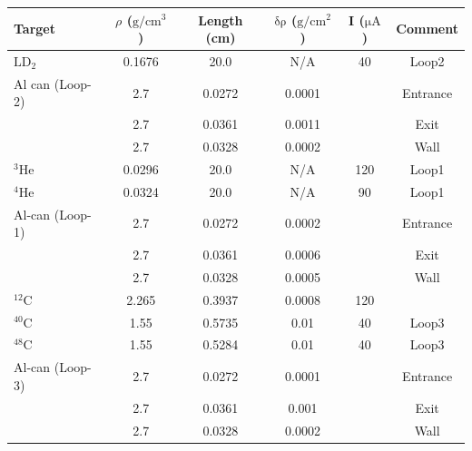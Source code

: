   \begin{table}[htbp]
   \begin{tabular}{lccccc}
   \toprule
   Target       &$\rho$ ($\mathrm{g/cm^{3}}$)& Length (cm)   & $\mathrm{\delta\rho}$ ($\mathrm{g/cm^{2}}$)& I ($\mathrm{\mu A}$)& Comment   \\
   \midrule
   $\mathrm{LD_{2}}$& 0.1676                 & 20.0          &     N/A                & 40          &Loop2      \\
   Al can (Loop-2)  & 2.7                    & 0.0272        &     0.0001             &             &  Entrance\\
                    & 2.7                    & 0.0361        &     0.0011             &             &  Exit     \\
                    & 2.7                    & 0.0328        &     0.0002             &             &  Wall     \\
   $\mathrm{^{3}He}$& 0.0296                 & 20.0          &     N/A                &120         &  Loop1    \\
   $\mathrm{^{4}He}$& 0.0324                 & 20.0          &     N/A                &90           &  Loop1    \\
   Al-can (Loop-1)  & 2.7                    & 0.0272        &     0.0002             &             &  Entrance \\
                    & 2.7                    & 0.0361        &     0.0006             &             &  Exit     \\
                    & 2.7                    & 0.0328        &     0.0005             &             &  Wall     \\
   $\mathrm{^{12}C}$&      2.265             & 0.3937        &     0.0008             &120          &           \\
   $\mathrm{^{40}C}$&      1.55              & 0.5735        &     0.01               &40           &  Loop3    \\
   $\mathrm{^{48}C}$&      1.55              & 0.5284        &     0.01               &40           &  Loop3    \\
   Al-can (Loop-3)  & 2.7                    & 0.0272        &     0.0001             &             &  Entrance \\
                    & 2.7                    & 0.0361        &     0.001             &              &  Exit     \\
                    & 2.7                    & 0.0328        &     0.0002             &             &  Wall     \\

\end{tabular}
\end{table}
